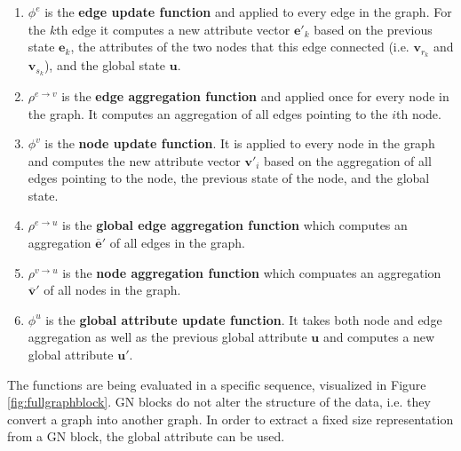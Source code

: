 \begin{enumerate}
    \item $\phi^e$ is the \textbf{edge update function} and applied to every edge in the graph. For the $k$th edge it computes a new attribute vector $\bm{e}'_k$ based on the previous state $\bm{e}_k$, the attributes of the two nodes that this edge connected (i.e. $\bm{v}_{r_k}$ and $\bm{v}_{s_k}$), and the global state $\bm{u}$.
    \item $\rho^{e\rightarrow v}$ is the \textbf{edge aggregation function} and applied once for every node in the graph. It computes an aggregation of all edges pointing to the $i$th node.
    \item $\phi^v$ is the \textbf{node update function}. It is applied to every node in the graph and computes the new attribute vector $\bm{v}'_i$ based on the aggregation of all edges pointing to the node, the previous state of the node, and the global state.
    \item $\rho^{e\rightarrow u}$ is the \textbf{global edge aggregation function} which computes an aggregation $\bm{\overline{e}}'$ of all edges in the graph.
    \item $\rho^{v\rightarrow u}$ is the \textbf{node aggregation function} which compuates an aggregation $\bm{\overline{v}}'$ of all nodes in the graph.
    \item $\phi^u$ is the \textbf{global attribute update function}. It takes both node and edge aggregation as well as the previous global attribute $\bm{u}$ and computes a new global attribute $\bm{u}'$.
\end{enumerate}

The functions are being evaluated in a specific sequence, visualized in Figure \ref{fig:fullgraphblock}. GN blocks do not alter the structure of the data, i.e. they convert a graph into another graph. In order to extract a fixed size representation from a GN block, the global attribute can be used.

